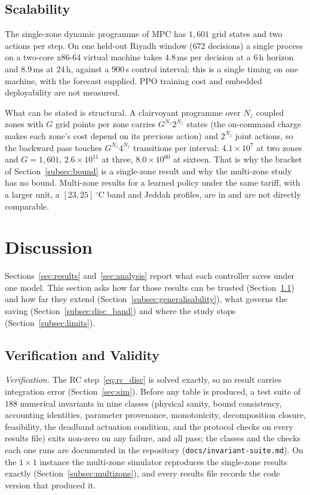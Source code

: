 \documentclass[pdflatex,sn-mathphys-num,iicol]{sn-jnl}
\theoremstyle{thmstyleone}\newtheorem{proposition}{Proposition}\newtheorem{corollary}{Corollary}
\theoremstyle{thmstyletwo}\newtheorem{remark}{Remark}\newtheorem{observation}{Observation}
\theoremstyle{thmstylethree}\newtheorem{definition}{Definition}
\begin{document}
\subsection{Scalability}
\label{subsec:abl_cost}

The single-zone dynamic programme of MPC has $1{,}601$ grid states and two actions per step. On one held-out Riyadh window ($672$ decisions) a single process on a two-core x86-64 virtual machine takes $4.8\,$ms per decision at a $6\,$h horizon and $8.9\,$ms at $24\,$h, against a $900\,$s control interval; this is a single timing on one machine, with the forecast supplied. PPO training cost and embedded deployability are not measured.

What can be stated is structural. A clairvoyant programme over $N_z$ coupled zones with $G$ grid points per zone carries $G^{N_z}2^{N_z}$ states (the on-command charge makes each zone's cost depend on its previous action) and $2^{N_z}$ joint actions, so the backward pass touches $G^{N_z}4^{N_z}$ transitions per interval: $4.1\times10^{7}$ at two zones and $G=1{,}601$, $2.6\times10^{11}$ at three, $8.0\times10^{60}$ at sixteen. That is why the bracket of Section~\ref{subsec:bound} is a single-zone result and why the multi-zone study has no bound. Multi-zone results for a learned policy under the same tariff, with a larger unit, a $[23,25]\,^\circ$C band and Jeddah profiles, are in \citep{Faraj2026} and are not directly comparable.

\section{Discussion}
\label{sec:discussion}

Sections~\ref{sec:results} and~\ref{sec:analysis} report what each controller saves under one model. This section asks how far those results can be trusted (Section~\ref{subsec:validity}) and how far they extend (Section~\ref{subsec:generalisability}), what governs the saving (Section~\ref{subsec:disc_band}) and where the study stops (Section~\ref{subsec:limits}).

\subsection{Verification and Validity}
\label{subsec:validity}

\emph{Verification.} The RC step~\eqref{eq:rc_disc} is solved exactly, so no result carries integration error (Section~\ref{sec:sim}). Before any table is produced, a test suite of $188$ numerical invariants in nine classes (physical sanity, bound consistency, accounting identities, parameter provenance, monotonicity, decomposition closure, feasibility, the deadband actuation condition, and the protocol checks on every results file) exits non-zero on any failure, and all pass; the classes and the checks each one runs are documented in the repository (\texttt{docs/invariant-suite.md}). On the $1\times1$ instance the multi-zone simulator reproduces the single-zone results exactly (Section~\ref{subsec:multizone}), and every results file records the code version that produced it.
\end{document}

